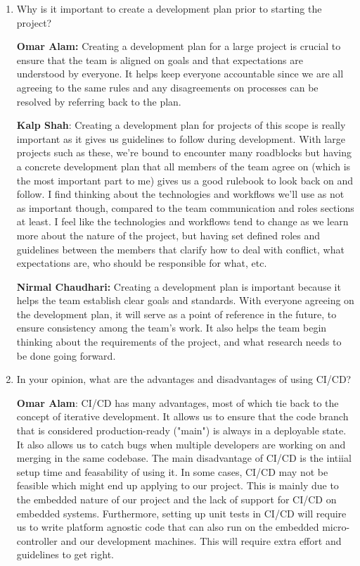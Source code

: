 \documentclass{article}
\begin{document}
\begin{enumerate}
    \item Why is it important to create a development plan prior to starting the
    project?

    \textbf{Omar Alam:} Creating a development plan for a large project is crucial to ensure that the team is aligned on goals
    and that expectations are understood by everyone. It helps keep everyone accountable since we are all agreeing to the same rules
    and any disagreements on processes can be resolved by referring back to the plan.

    \textbf{Kalp Shah}: Creating a development plan for projects of this scope is really important as it gives us guidelines to follow
    during development. With large projects such as these, we're bound to encounter many roadblocks but having a concrete development 
    plan that all members of the team agree on (which is the most important part to me) gives us a good rulebook to look back on and 
    follow. I find thinking about the technologies and workflows we'll use as not as important though, compared to the team communication 
    and roles sections at least. I feel like the technologies and workflows tend to change as we learn more about the nature of the 
    project, but having set defined roles and guidelines between the members that clarify how to deal with conflict, what expectations 
    are, who should be responsible for what, etc. 
    
    \textbf{Nirmal Chaudhari:} Creating a development plan is important because it helps the team establish clear goals and standards. 
    With everyone agreeing on the development plan, it will serve as a point of reference in the future, to ensure consistency among the team's work. 
    It also helps the team begin thinking about the requirements of the project, and what research needs to be done going forward. 

    
    \item In your opinion, what are the advantages and disadvantages of using
    CI/CD?

    \textbf{Omar Alam}: CI/CD has many advantages, most of which tie back to the concept of iterative development. It allows us to ensure
    that the code branch that is considered production-ready ("main") is always in a deployable state. It also allows us to catch bugs when multiple 
    developers are working on and merging in the same codebase. The main disadvantage of CI/CD is the intiial setup time and feasability of using it.
    In some cases, CI/CD may not be feasible which might end up applying to our project. This is mainly due to the embedded nature of our project 
    and the lack of support for CI/CD on embedded systems. Furthermore, setting up unit tests in CI/CD will require us to write platform agnostic
    code that can also run on the embedded micro-controller and our development machines. This will require extra effort and guidelines to get right.


\end{enumerate}
\end{document}
